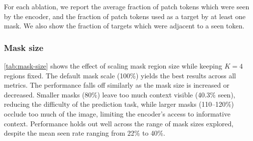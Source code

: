 For each ablation, we report the average fraction of patch tokens which were seen by the encoder, and the fraction of patch tokens used as a target by at least one mask.
We also show the fraction of targets which were adjacent to a seen token.

\subsubsection{Mask size}

\cref{tab:mask-size} shows the effect of scaling mask region size while keeping $K{=}4$ regions fixed.
The default mask scale (100\%) yields the best results across all metrics.
The performance falls off similarly as the mask size is increased or decreased.
Smaller masks (80\%) leave too much context visible (40.3\% seen), reducing the difficulty of the prediction task, while larger masks (110--120\%) occlude too much of the image, limiting the encoder's access to informative context.
Performance holds out well across the range of mask sizes explored, despite the mean seen rate ranging from 22\% to 40\%.


\begin{table}[tbh]
\centering
\caption{Effect of mask region size. The mask scale is varied as a percentage relative to the default (highlighted), keeping the number of mask regions fixed at $K{=}4$. ViT-S, 300 ep. on IN-1k.}
\label{tab:mask-size}
\small
{}
\end{table}


